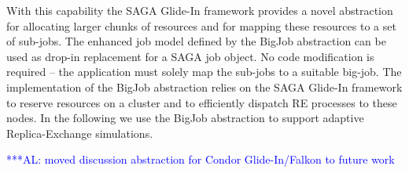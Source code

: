 \documentclass{rspublic}
\newcommand{\alnote}[1]{ {\textcolor{blue} { ***AL: #1 }}}
\newcommand{\alnote}[1]{}
\newcommand{\glidein}[1]{Glide-In }
\newcommand{\remanager}[1]{RE-Manager }
\begin{document}
With this capability the SAGA Glide-In framework provides a novel
abstraction for allocating larger chunks of resources and
for mapping these resources to a set of sub-jobs. 
The enhanced job model defined by the BigJob abstraction can be used 
as drop-in replacement for a SAGA job object. No code modification 
is required -- the application must solely map the
sub-jobs to a suitable big-job.  The implementation of the BigJob abstraction
relies on the SAGA Glide-In framework to reserve resources on a cluster and to
efficiently dispatch RE processes to these nodes.  In the following we use
the BigJob abstraction to support adaptive Replica-Exchange simulations.
                                         



\alnote{moved discussion abstraction for Condor Glide-In/Falkon to future work}


\end{document}
